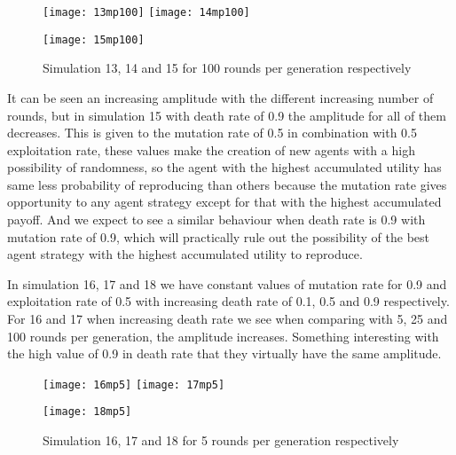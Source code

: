 \documentclass{book}
\begin{document}
\begin{figure}[H]       
    \begin{center}
    \mbox{\texttt{[image: 13mp100]}}   
    \hspace{0px}
    \mbox{\texttt{[image: 14mp100]}}
    \hspace{40px}
    \end{center}
    \begin{center}
    \mbox{\texttt{[image: 15mp100]}}
    \end{center}
    \caption{Simulation 13, 14 and 15 for 100 rounds per generation respectively}
    \label{simulation131415mp100}
\end{figure}
It can be seen an increasing amplitude with the different increasing number of rounds, but in simulation 15 with death rate of 0.9 the amplitude for all of them decreases. This is given to the mutation rate of 0.5 in combination with 0.5 exploitation rate, these values make the creation of new agents with a high possibility of randomness, so the agent with the highest accumulated utility has same less probability of reproducing than others because the mutation rate gives opportunity to any agent strategy except for that with the highest accumulated payoff. And we expect to see a similar behaviour when death rate is 0.9 with mutation rate of 0.9, which will practically rule out the possibility of the best agent strategy with the highest accumulated utility to reproduce.

In simulation 16, 17 and 18 we have constant values of mutation rate for 0.9 and exploitation rate of 0.5 with increasing death rate of 0.1, 0.5 and 0.9 respectively. For 16 and 17 when increasing death rate we see when comparing with 5, 25 and 100 rounds per generation, the amplitude increases. Something interesting with the high value of 0.9 in death rate that they virtually have the same amplitude.

\begin{figure}[H]       
    \begin{center}
    \mbox{\texttt{[image: 16mp5]}}   
    \hspace{0px}
    \mbox{\texttt{[image: 17mp5]}}
    \hspace{40px}
    \end{center}
    \begin{center}
    \mbox{\texttt{[image: 18mp5]}}
    \end{center}
    \caption{Simulation 16, 17 and 18 for 5 rounds per generation respectively}
    \label{simulation161718mp5}
\end{figure}
\end{document}
